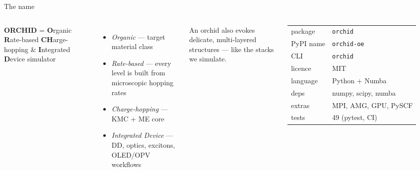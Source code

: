 \documentclass[aspectratio=169,10pt]{beamer}
\begin{document}
\begin{frame}{The name}
\begin{columns}[c]
\textbf{ORCHID} = \textbf{O}rganic \textbf{R}ate-based \textbf{CH}arge-hopping \& \textbf{I}ntegrated \textbf{D}evice simulator
\begin{itemize}
\item \emph{Organic} --- target material class
\item \emph{Rate-based} --- every level is built from microscopic hopping rates
\item \emph{Charge-hopping} --- KMC + ME core
\item \emph{Integrated Device} --- DD, optics, excitons, OLED/OPV workflows
\end{itemize}
An orchid also evokes delicate, multi-layered structures --- like the stacks we simulate.
\small
\begin{tabular}{ll}
\toprule
package & \texttt{orchid}\\
PyPI name & \texttt{orchid-oe}\\
CLI & \texttt{orchid}\\
licence & MIT\\
language & Python + Numba\\
deps & numpy, scipy, numba\\ extras & MPI, AMG, GPU, PySCF\\
tests & 49 (pytest, CI)\\
\bottomrule
\end{tabular}
\end{columns}
\end{frame}
\end{document}
